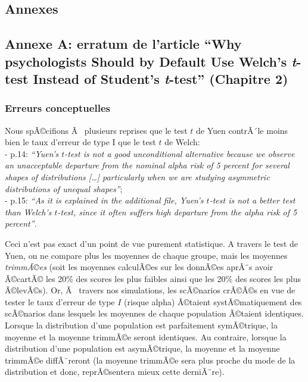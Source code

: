 \clearpage



\begin{appendix}
\hypertarget{annexes}{%
\section{Annexes}\label{annexes}}

\hypertarget{annexe-a-erratum-de-larticle-why-psychologists-should-by-default-use-welchs-t-test-instead-of-students-t-test-chapitre-2}{%
\subsection{\texorpdfstring{Annexe A: erratum de l'article ``Why
psychologists Should by Default Use Welch's \emph{t}-test Instead of
Student's \emph{t}-test'' (Chapitre
2)}{Annexe A: erratum de l'article ``Why psychologists Should by Default Use Welch's t-test Instead of Student's t-test'' (Chapitre 2)}}\label{annexe-a-erratum-de-larticle-why-psychologists-should-by-default-use-welchs-t-test-instead-of-students-t-test-chapitre-2}}

\hypertarget{erreurs-conceptuelles}{%
\subsubsection{Erreurs conceptuelles}\label{erreurs-conceptuelles}}

Nous spÃ©cifions Ã~ plusieurs reprises que le test \(t\) de Yuen
contrÃ´le moins bien le taux d'erreur de type I que le test \(t\) de
Welch:\\
- p.14: \emph{``Yuen's \(t\)-test is not a good unconditional
alternative because we observe an unacceptable departure from the
nominal alpha risk of 5 percent for several shapes of distributions
{[}\ldots{]} particularly when we are studying asymmetric distributions
of unequal shapes''};\\
- p.15: \emph{``As it is explained in the additional file, Yuen's
\(t\)-test is not a better test than Welch's \(t\)-test, since it often
suffers high departure from the alpha risk of 5 percent''}.

Ceci n'est pas exact d'un point de vue purement statistique. A travers
le test de Yuen, on ne compare plus les moyennes de chaque groupe, mais
les moyennes \emph{trimmÃ©es} (soit les moyennes calculÃ©es sur les
donnÃ©es aprÃ¨s avoir Ã©cartÃ© les 20\% des scores les plus faibles
ainsi que les 20\% des scores les plus Ã©levÃ©s). Or, Ã~ travers nos
simulations, les scÃ©narios crÃ©Ã©s en vue de tester le taux d'erreur de
type \(I\) (risque alpha) Ã©taient systÃ©matiquement des scÃ©narios dans
lesquels les moyennes de chaque population Ã©taient identiques. Lorsque
la distribution d'une population est parfaitement symÃ©trique, la
moyenne et la moyenne trimmÃ©e seront identiques. Au contraire, lorsque
la distribution d'une population est asymÃ©trique, la moyenne et la
moyenne trimmÃ©e diffÃ¨reront (la moyenne trimmÃ©e sera plus proche du
mode de la distribution et donc, reprÃ©sentera mieux cette derniÃ¨re).


\end{appendix}
